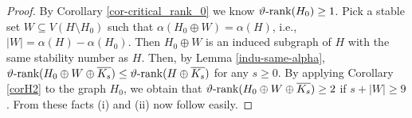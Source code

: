 \documentclass[11pt]{article}
\numberwithin{equation}{section}
\newcommand{\rrank}{\vartheta\text{\rm -rank}}
\begin{document}
\begin{proof}
By Corollary \ref{cor-critical_rank_0} we know   $\rrank(H_0)\ge 1$.
Pick a stable set $W\subseteq V(H\setminus H_0)$ such that $\alpha(H_0\oplus W)=\alpha(H)$, i.e., $|W|=\alpha(H)-\alpha(H_0)$. Then $H_0\oplus W$ is an induced subgraph of $H$ with the same stability number as $H$. Then, by Lemma \ref{indu-same-alpha}, $\rrank(H_0\oplus W \oplus \overline{K_s})\leq \rrank(H\oplus \overline{K_s})$ for any $s\geq 0$. By applying  Corollary \ref{corH2} to the graph $H_0$,  we obtain that $\rrank(H_0 \oplus W\oplus \overline{K_s})\geq 2$ if $s+|W|\geq 9$. From these facts  (i) and (ii) now follow easily.
\end{proof}
\end{document}
